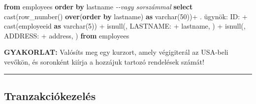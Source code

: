 \documentclass[
  magyar,
]{article}
\newenvironment{Shaded}{}{}
\newcommand{\CommentTok}[1]{\textcolor[rgb]{0.38,0.63,0.69}{\textit{#1}}}
\newcommand{\DataTypeTok}[1]{\textcolor[rgb]{0.56,0.13,0.00}{#1}}
\newcommand{\DecValTok}[1]{\textcolor[rgb]{0.25,0.63,0.44}{#1}}
\newcommand{\FunctionTok}[1]{\textcolor[rgb]{0.02,0.16,0.49}{#1}}
\newcommand{\KeywordTok}[1]{\textcolor[rgb]{0.00,0.44,0.13}{\textbf{#1}}}
\newcommand{\NormalTok}[1]{#1}
\newcommand{\OperatorTok}[1]{\textcolor[rgb]{0.40,0.40,0.40}{#1}}
\newcommand{\StringTok}[1]{\textcolor[rgb]{0.25,0.44,0.63}{#1}}
\begin{document}
\begin{Shaded}
\begin{Highlighting}[]
\KeywordTok{from}\NormalTok{ employees }\KeywordTok{order} \KeywordTok{by}\NormalTok{ lastname}
\CommentTok{{-}{-}vagy sorszámmal}
\KeywordTok{select} \FunctionTok{cast}\NormalTok{(}\FunctionTok{row\_number}\NormalTok{() }\KeywordTok{over}\NormalTok{(}\KeywordTok{order} \KeywordTok{by}\NormalTok{ lastname) }\KeywordTok{as} \DataTypeTok{varchar}\NormalTok{(}\DecValTok{50}\NormalTok{))}\OperatorTok{+}
\StringTok{\textquotesingle{}. ügynök: ID: \textquotesingle{}} \OperatorTok{+} \FunctionTok{cast}\NormalTok{(employeeid }\KeywordTok{as} \DataTypeTok{varchar}\NormalTok{(}\DecValTok{5}\NormalTok{)) }\OperatorTok{+}\NormalTok{ isnull(}\StringTok{\textquotesingle{}, LASTNAME: \textquotesingle{}} \OperatorTok{+}\NormalTok{ lastname, }\StringTok{\textquotesingle{}\textquotesingle{}}\NormalTok{) }\OperatorTok{+}
\NormalTok{isnull(}\StringTok{\textquotesingle{}, ADDRESS: \textquotesingle{}} \OperatorTok{+}\NormalTok{ address, }\StringTok{\textquotesingle{}\textquotesingle{}}\NormalTok{)}
\KeywordTok{from}\NormalTok{ employees}
\end{Highlighting}
\end{Shaded}

\textbf{GYAKORLAT:} Valósíts meg egy kurzort, amely végigiterál az
USA-beli vevőkön, és soronként kiírja a hozzájuk tartozó rendelések
számát!

\begin{center}\rule{0.5\linewidth}{0.5pt}\end{center}

\subsection{Tranzakciókezelés}\label{tranzakciuxf3kezeluxe9s}
\end{document}
